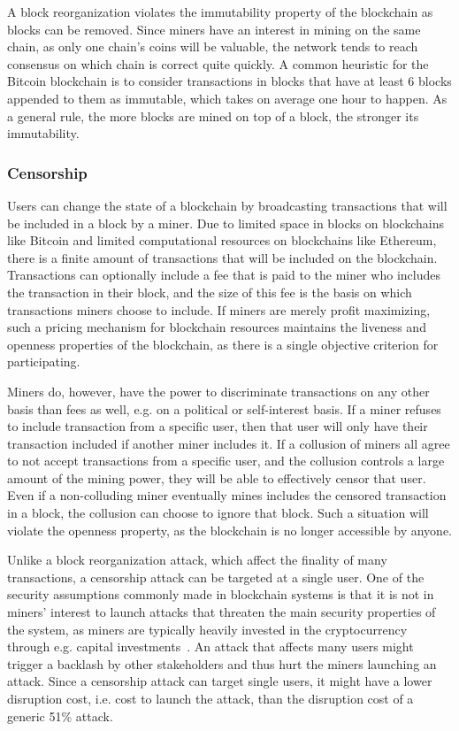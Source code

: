 A block reorganization violates the immutability property of the blockchain as blocks can be removed. Since miners have an interest in mining on the same chain, as only one chain's coins will be valuable, the network tends to reach consensus on which chain is correct quite quickly. A common heuristic for the Bitcoin blockchain is to consider transactions in blocks that have at least 6 blocks appended to them as immutable, which takes on average one hour to happen. As a general rule, the more blocks are mined on top of a block, the stronger its immutability. 


\subsubsection{Censorship}
Users can change the state of a blockchain by broadcasting transactions that will be included in a block by a miner. Due to limited space in blocks on blockchains like Bitcoin and limited computational resources on blockchains like Ethereum, there is a finite amount of transactions that will be included on the blockchain. Transactions can optionally include a fee that is paid to the miner who includes the transaction in their block, and the size of this fee is the basis on which transactions miners choose to include. If miners are merely profit maximizing, such a pricing mechanism for blockchain resources maintains the liveness and openness properties of the blockchain, as there is a single objective criterion for participating.

Miners do, however, have the power to discriminate transactions on any other basis than fees as well, e.g. on a political or self-interest basis. If a miner refuses to include transaction from a specific user, then that user will only have their transaction included if another miner includes it. If a collusion of miners all agree to not accept transactions from a specific user, and the collusion controls a large amount of the mining power, they will be able to effectively censor that user. Even if a non-colluding miner eventually mines includes the censored transaction in a block, the collusion can choose to ignore that block. Such a situation will violate the openness property, as the blockchain is no longer accessible by anyone. 

Unlike a block reorganization attack, which affect the finality of many transactions, a censorship attack can be targeted at a single user. One of the security assumptions commonly made in blockchain systems is that it is not in miners' interest to launch attacks that threaten the main security properties of the system, as miners are typically heavily invested in the cryptocurrency through e.g. capital investments~\cite{buterin_problem_2015,wuille_security_2019}. An attack that affects many users might trigger a backlash by other stakeholders and thus hurt the miners launching an attack. Since a censorship attack can target single users, it might have a lower disruption cost, i.e. cost to launch the attack, than the disruption cost of a generic 51\% attack. 

